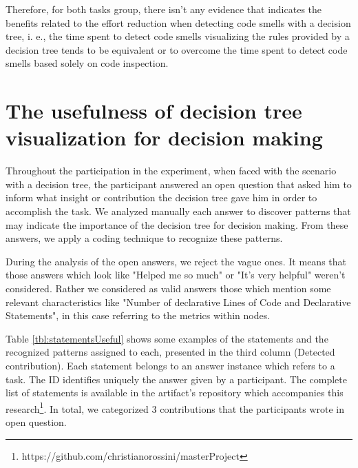 Therefore, for both tasks group, there isn't any evidence that indicates the benefits related to the effort reduction when detecting code smells with a decision tree, i. e., the time spent to detect code smells visualizing the rules provided by a decision tree tends to be equivalent or to overcome the time spent to detect code smells based solely on code inspection. 

\section{The usefulness of decision tree visualization for decision making} \label{sec:usefulnessDecisionTree}

Throughout the participation in the experiment, when faced with the scenario with a decision tree, the participant answered an open question that asked him to inform what insight or contribution the decision tree gave him in order to accomplish the task. We analyzed manually each answer to discover patterns that may indicate the importance of the decision tree for decision making.  From these answers, we apply a coding technique \cite{seaman1999qualitative} to recognize these patterns. 

During the analysis of the open answers, we reject the vague ones. It means that those answers which look like "Helped me so much" or  "It's very helpful" weren't considered. Rather we considered as valid answers those which mention some relevant characteristics like "Number of declarative Lines of Code and Declarative Statements", in this case referring to the metrics within nodes.

Table \ref{tbl:statementsUseful} shows some examples of the statements and the recognized patterns assigned to each, presented in the third column (Detected contribution). Each statement belongs to an answer instance which refers to a task. The ID identifies uniquely the answer given by a participant. The complete list of statements is available in the artifact's repository which accompanies this research\footnote{https://github.com/christianorossini/masterProject}. In total, we categorized 3 contributions that the participants wrote in open question.

